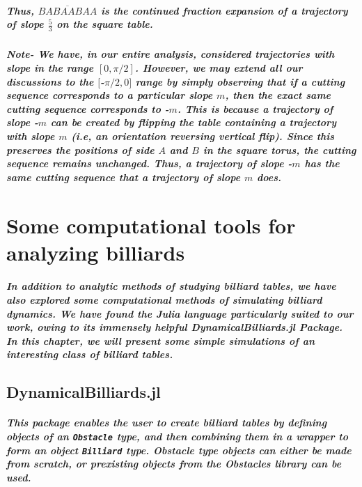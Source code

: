 \documentclass{report}
\begin{document}
\paragraph{Thus, $\overline{BABAABAA}$ is the continued fraction expansion of a trajectory of slope $\frac{5}{3}$ on the square table.}


\paragraph{Note- We have, in our entire analysis, considered trajectories with slope in the range $[0, \pi/2]$. However, we may extend all our discussions to the $[$-$\pi/2, 0]$ range by simply observing that if a cutting sequence corresponds to a particular slope $m$, then the exact same cutting sequence corresponds to -$m$. This is because a trajectory of slope -$m$ can be created by flipping the table containing a trajectory with slope $m$ (i.e, an orientation reversing vertical flip). Since this preserves the positions of side $A$ and $B$ in the square torus, the cutting sequence remains unchanged. Thus, a trajectory of slope -$m$ has the same cutting sequence that a trajectory of slope $m$ does.}



\chapter{Some computational tools for analyzing billiards}

\paragraph{In addition to analytic methods of studying billiard tables, we have also explored some computational methods of simulating billiard dynamics. We have found the Julia language particularly suited to our work, owing to its immensely helpful DynamicalBilliards.jl Package. In this chapter, we will present some simple simulations of an interesting class of billiard tables. }


\section{DynamicalBilliards.jl}

\paragraph{This package enables the user to create billiard tables by defining objects of an \verb|Obstacle| type, and then combining them in a wrapper to form an object \verb|Billiard| type. Obstacle type objects can either be made from scratch, or prexisting objects from the Obstacles library can be used.}
\end{document}
